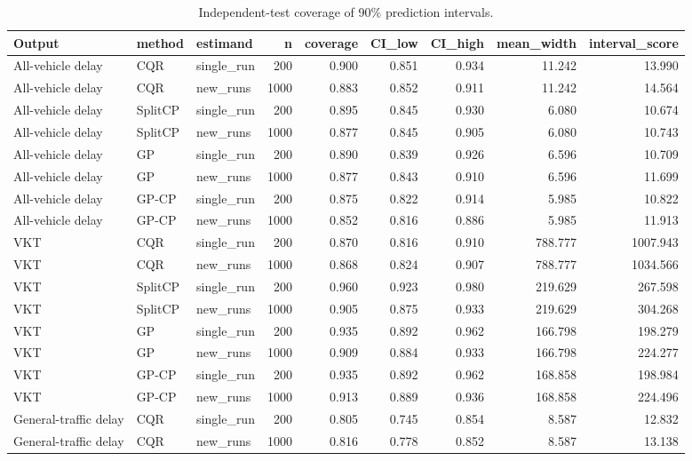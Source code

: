 \begin{table}[!htbp]
\centering
\small
\caption{Independent-test coverage of 90\% prediction intervals.}
\label{tab:intervals}
\begin{tabular}{lllrrrrrr}
\toprule
Output & method & estimand & n & coverage & CI\_low & CI\_high & mean\_width & interval\_score \\
\midrule
All-vehicle delay & CQR & single\_run & 200 & 0.900 & 0.851 & 0.934 & 11.242 & 13.990 \\
All-vehicle delay & CQR & new\_runs & 1000 & 0.883 & 0.852 & 0.911 & 11.242 & 14.564 \\
All-vehicle delay & SplitCP & single\_run & 200 & 0.895 & 0.845 & 0.930 & 6.080 & 10.674 \\
All-vehicle delay & SplitCP & new\_runs & 1000 & 0.877 & 0.845 & 0.905 & 6.080 & 10.743 \\
All-vehicle delay & GP & single\_run & 200 & 0.890 & 0.839 & 0.926 & 6.596 & 10.709 \\
All-vehicle delay & GP & new\_runs & 1000 & 0.877 & 0.843 & 0.910 & 6.596 & 11.699 \\
All-vehicle delay & GP-CP & single\_run & 200 & 0.875 & 0.822 & 0.914 & 5.985 & 10.822 \\
All-vehicle delay & GP-CP & new\_runs & 1000 & 0.852 & 0.816 & 0.886 & 5.985 & 11.913 \\
VKT & CQR & single\_run & 200 & 0.870 & 0.816 & 0.910 & 788.777 & 1007.943 \\
VKT & CQR & new\_runs & 1000 & 0.868 & 0.824 & 0.907 & 788.777 & 1034.566 \\
VKT & SplitCP & single\_run & 200 & 0.960 & 0.923 & 0.980 & 219.629 & 267.598 \\
VKT & SplitCP & new\_runs & 1000 & 0.905 & 0.875 & 0.933 & 219.629 & 304.268 \\
VKT & GP & single\_run & 200 & 0.935 & 0.892 & 0.962 & 166.798 & 198.279 \\
VKT & GP & new\_runs & 1000 & 0.909 & 0.884 & 0.933 & 166.798 & 224.277 \\
VKT & GP-CP & single\_run & 200 & 0.935 & 0.892 & 0.962 & 168.858 & 198.984 \\
VKT & GP-CP & new\_runs & 1000 & 0.913 & 0.889 & 0.936 & 168.858 & 224.496 \\
General-traffic delay & CQR & single\_run & 200 & 0.805 & 0.745 & 0.854 & 8.587 & 12.832 \\
General-traffic delay & CQR & new\_runs & 1000 & 0.816 & 0.778 & 0.852 & 8.587 & 13.138 \\

\end{tabular}
\end{table}
